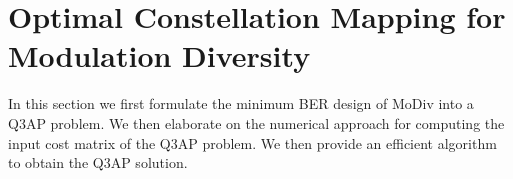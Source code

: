 \documentclass[journal]{IEEEtran}
\begin{document}

\section{Optimal Constellation Mapping for Modulation Diversity}
\label{sec:core}
In this section we first formulate the minimum BER design of MoDiv into a Q3AP problem.
We then elaborate on the numerical approach for computing the input cost matrix of the Q3AP
problem. We then provide an efficient algorithm to obtain the Q3AP solution.
\end{document}
